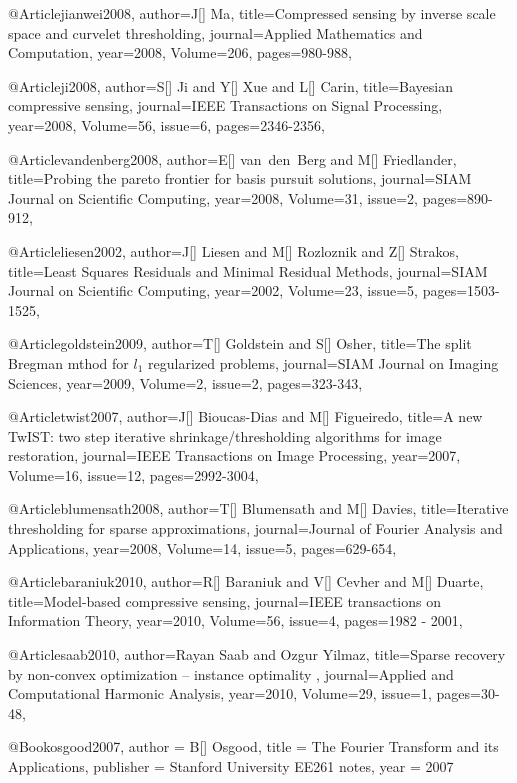 {@Article{jianwei2008,
  author={J[] Ma},
  title={Compressed sensing by inverse scale space and curvelet thresholding},
  journal={Applied Mathematics and Computation},
  year=2008,
  Volume=206,
  pages={980-988},
}

@Article{ji2008,
  author={S[] Ji and Y[] Xue and L[] Carin},
  title={Bayesian compressive sensing},
  journal={IEEE Transactions on Signal Processing},
  year=2008,
  Volume=56,
  issue=6,
  pages={2346-2356},
}

@Article{vandenberg2008,
  author={E[] van~den~Berg and M[] Friedlander},
  title={Probing the pareto frontier for basis pursuit solutions},
  journal={SIAM Journal on Scientific Computing},
  year=2008,
  Volume=31,
  issue=2,
  pages={890-912},
}

@Article{liesen2002,
  author={J[] Liesen and M[] Rozloznik and Z[] Strakos},
  title={Least Squares Residuals and Minimal Residual Methods},
  journal={SIAM Journal on Scientific Computing},
  year=2002,
  Volume=23,
  issue=5,
  pages={1503-1525},
}

@Article{goldstein2009,
  author={T[] Goldstein and S[] Osher},
  title={The split Bregman mthod for $l_1$ regularized problems},
  journal={SIAM Journal on Imaging Sciences},
  year=2009,
  Volume=2,
  issue=2,
  pages={323-343},
}



@Article{twist2007,
  author={J[] Bioucas-Dias and M[] Figueiredo},
  title={A new TwIST: two step iterative shrinkage/thresholding algorithms for image restoration},
  journal={IEEE Transactions on Image Processing},
  year=2007,
  Volume=16,
  issue=12,
  pages={2992-3004},
}

@Article{blumensath2008,
  author={T[] Blumensath and M[] Davies},
  title={Iterative thresholding for sparse approximations},
  journal={Journal of {F}ourier Analysis and Applications},
  year=2008,
  Volume=14,
  issue=5,
  pages={629-654},
}

@Article{baraniuk2010,
  author={R[] Baraniuk and V[] Cevher and M[] Duarte},
  title={Model-based compressive sensing},
  journal={IEEE transactions on Information Theory},
  year=2010,
  Volume=56,
  issue=4,
  pages={1982 - 2001},
}

@Article{saab2010,
  author={Rayan Saab and Ozgur Yilmaz},
  title={Sparse recovery by non-convex optimization – instance optimality },
  journal={Applied and Computational Harmonic Analysis},
  year=2010,
  Volume=29,
  issue=1,
  pages={30-48},
}

@Book{osgood2007,
  author =	 {B[] Osgood},
  title =	 {The {F}ourier Transform and its Applications},
  publisher =	 {Stanford University EE261 notes},
  year =	 2007
}

}

